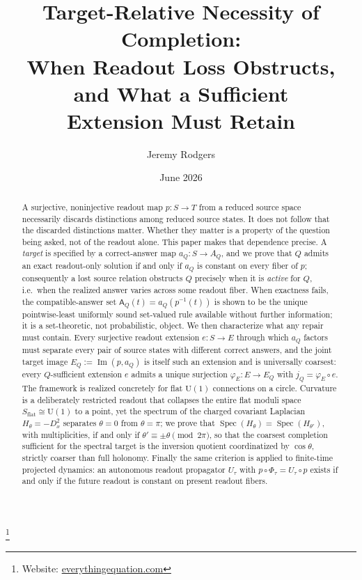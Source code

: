 \documentclass[11pt,reqno]{amsart}
\theoremstyle{plain}
\theoremstyle{definition}
\newcommand{\Uone}{\mathrm{U}(1)}
\newcommand{\Src}{S}
\newcommand{\Rdt}{T}
\newcommand{\CompatSet}{\mathsf{A}}      %
\newcommand{\Spec}{\operatorname{Spec}}
\newcommand{\Img}{\operatorname{Im}}
\newcommand{\Dx}{D_{x}}
\begin{document}
\title[Target-Relative Necessity of Completion]{Target-Relative Necessity of Completion:\\
When Readout Loss Obstructs, and What a Sufficient\\ Extension Must Retain}

\author{Jeremy Rodgers}
\thanks{Website: \href{https://everythingequation.com}{everythingequation.com}}
\address{Independent Researcher}

\date{June 2026}



\begin{abstract}
A surjective, noninjective readout map $p\colon\Src\to\Rdt$ from a reduced source space
necessarily discards distinctions among reduced source states. It does not follow that the
discarded distinctions matter. Whether they matter is a property of the question being asked,
not of the readout alone. This paper makes that dependence precise. A \emph{target} is specified
by a correct-answer map $a_Q\colon\Src\to A_Q$, and we prove that $Q$ admits an exact
readout-only solution if and only if $a_Q$ is constant on every fiber of $p$; consequently a
lost source relation obstructs $Q$ precisely when it is \emph{active} for $Q$, i.e.\ when the
realized answer varies across some readout fiber. When exactness fails, the compatible-answer
set $\CompatSet_Q(t)=a_Q(p^{-1}(t))$ is shown to be the unique pointwise-least uniformly sound
set-valued rule available without further information; it is a set-theoretic, not probabilistic,
object. We then characterize what any repair must contain. Every surjective readout extension
$e\colon\Src\to E$ through which $a_Q$ factors must separate every pair of source states with
different correct answers, and the joint target image $E_Q:=\Img(p,a_Q)$ is itself such an
extension and is universally coarsest: every $Q$-sufficient extension $e$ admits a unique
surjection $\varphi_E\colon E\to E_Q$ with $j_Q=\varphi_E\circ e$. The framework is realized
concretely for flat $\Uone$ connections on a circle. Curvature is a deliberately restricted
readout that collapses the entire flat moduli space $\Src_{\mathrm{flat}}\cong\Uone$ to a point,
yet the spectrum of the charged covariant Laplacian $H_\theta=-\Dx^2$ separates $\theta=0$ from
$\theta=\pi$; we prove that $\Spec(H_\theta)=\Spec(H_{\theta'})$, with multiplicities, if and
only if $\theta'\equiv\pm\theta \pmod{2\pi}$, so that the coarsest completion sufficient for the
spectral target is the inversion quotient coordinatized by $\cos\theta$, strictly coarser than
full holonomy. Finally the same criterion is applied to finite-time projected dynamics: an
autonomous readout propagator $U_\tau$ with $p\circ\Phi_\tau=U_\tau\circ p$ exists if and only
if the future readout is constant on present readout fibers.
\end{abstract}
\end{document}
